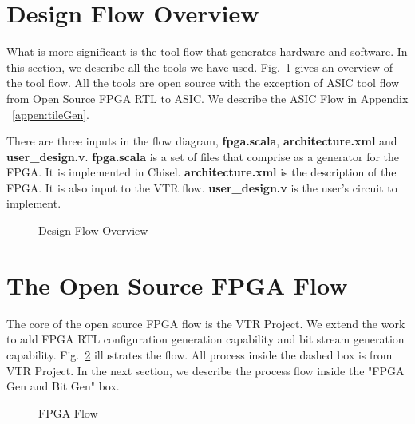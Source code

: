 \section{Design Flow Overview}
\label{sec:flow_over}

What is more significant is the tool flow that generates hardware and software. 
In this section, we describe all the tools we have used. Fig.~\ref{fig:flow_over} gives an overview of the tool flow.
 All the tools are open source with the exception of ASIC tool flow from Open Source FPGA RTL
 to ASIC. We describe the ASIC Flow in Appendix ~\ref{appen:tileGen}. \par

There are three inputs in the flow diagram, \textbf{fpga.scala}, \textbf{architecture.xml} and \textbf{user\_design.v}.
\textbf{fpga.scala} is a set of files that comprise as a generator for the FPGA. It is implemented in Chisel.
\textbf{architecture.xml} is the description of the FPGA. It is also input to the VTR flow. \cite{Rose:2012:VPA:2145694.2145708}
\textbf{user\_design.v} is the user's circuit to implement. \par

\begin{figure}[htp]
	\begin{center}
    \epsfysize=5in
		    \renewcommand{\captionfont}{\small}
				\caption{Design Flow Overview
				\label{fig:flow_over}}
	\end{center}
\end{figure}

\section{The Open Source FPGA Flow}
\label{sec:vtr_flow}

The core of the open source FPGA flow is the VTR Project. \cite{Rose:2012:VPA:2145694.2145708}
We extend the work to add FPGA RTL configuration generation capability and bit stream generation capability.
Fig.~\ref{fig:vtr_flow} illustrates the flow. All process inside the dashed box is from VTR Project.
In the next section, we describe the process flow inside the "FPGA Gen and Bit Gen" box. \par

\begin{figure}[htp]
	\begin{center}
    \epsfysize=6in
		    \renewcommand{\captionfont}{\small}
				\caption{FPGA Flow
				\label{fig:vtr_flow}}
	\end{center}
\end{figure}

